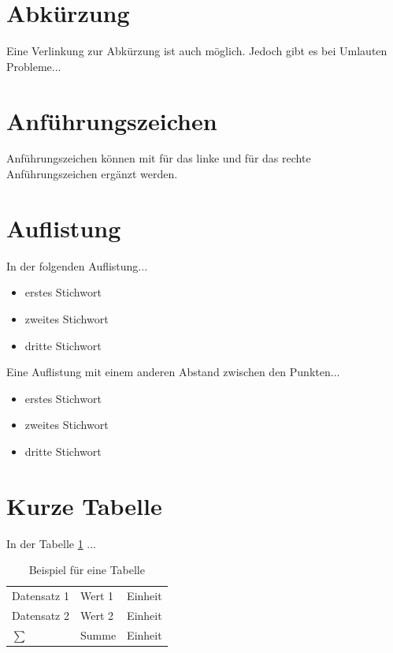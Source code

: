 \section{Abkürzung}
Eine Verlinkung zur \acs{Abkürzung} ist auch möglich. Jedoch gibt es bei Umlauten Probleme...

\section{Anführungszeichen}
\glqq Anführungszeichen\grqq{} können mit \texttt{\glqq} für das linke und \texttt{\grqq{}} für das rechte Anführungszeichen ergänzt werden.

\section{Auflistung}
In der folgenden Auflistung...
\begin{itemize}
    \setlength\itemsep{-1em}
    \item erstes Stichwort
    \item zweites Stichwort
    \item dritte Stichwort
\end{itemize}

Eine Auflistung mit einem anderen Abstand zwischen den Punkten...
\begin{itemize}
    \setlength\itemsep{-0.5em}
    \item erstes Stichwort
    \item zweites Stichwort
    \item dritte Stichwort
\end{itemize}

\section{Kurze Tabelle}
In der Tabelle \ref{tbl_example_table} ...

\begin{table}[!h]
    \centering
    \begin{tabular}{l|ll}
        Datensatz 1     & Wert 1    & Einheit \\
        Datensatz 2     & Wert 2    & Einheit \\ \hline
        $\sum$          & Summe     & Einheit \\
    \end{tabular}
    \caption{Beispiel für eine Tabelle}
    \label{tbl_example_table}
\end{table}

